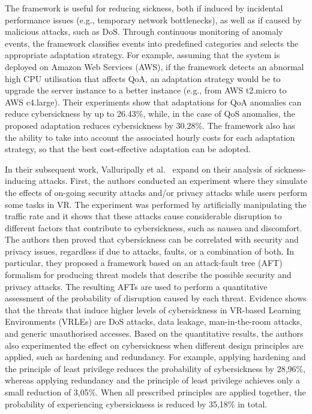 \documentclass[journal]{IEEEtran}
\begin{document}
The framework is useful for reducing sickness, both if induced by incidental performance issues (e.g., temporary network bottlenecks), as well as if caused by malicious attacks, such as DoS. Through continuous monitoring of anomaly events, the framework classifies events into predefined categories and selects the appropriate adaptation strategy. For example, assuming that the system is deployed on Amazon Web Services (AWS), if the framework detects an abnormal high CPU utilisation that affects QoA, an adaptation strategy would be to upgrade the server instance to a better instance (e.g., from AWS t2.micro to AWS c4.large). Their experiments show that adaptations for QoA anomalies can reduce cybersickness by up to 26.43\%, while, in the case of QoS anomalies, the proposed adaptation reduces cybersickness by 30.28\%. The framework also has the ability to take into account the associated hourly costs for each adaptation strategy, so that the best cost-effective adaptation can be adopted.

In their subsequent work, Valluripally et al.~\cite{valluripally2020,valluripally2021modeling} expand on their analysis of sickness-inducing attacks. First, the authors conducted an experiment where they simulate the effects of on-going security attacks and/or privacy attacks while users perform some tasks in VR. The experiment was performed by artificially manipulating the traffic rate and it shows that these attacks cause considerable disruption to different factors that contribute to cybersickness, such as nausea and discomfort. 
The authors then proved that cybersickness can be correlated with security and privacy issues, regardless if due to attacks, faults, or a combination of both. In particular, they proposed a framework based on an attack-fault tree (AFT) formalism for producing threat models that describe the possible security and privacy attacks. The resulting AFTs are used to perform a quantitative assessment of the probability of disruption caused by each threat. Evidence shows that the threats that induce higher levels of cybersickness in VR-based Learning Environments (VRLEs) are DoS attacks, data leakage, man-in-the-room attacks, and generic unauthorised accesses.
Based on the quantitative results, the authors also experimented the effect on cybersickness when different design principles are applied, such as hardening and redundancy. For example, applying hardening and the principle of least privilege reduces the probability of cybersickness by 28,96\%, whereas applying redundancy and the principle of least privilege achieves only a small reduction of 3,05\%. When all prescribed principles are applied together, the probability of experiencing cybersickness is reduced by 35,18\% in total.
\end{document}
